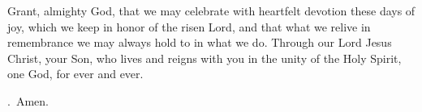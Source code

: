 \lettrine[lines=3]{G}{}rant, almighty God,
that we may celebrate with heartfelt devotion these days of joy,
which we keep in honor of the risen Lord,
and that what we relive in remembrance
we may always hold to in what we do.
Through our Lord Jesus Christ, your Son,
who lives and reigns with you in the unity of the Holy Spirit,
one God, for ever and ever.
\par \Rbar.~Amen.
